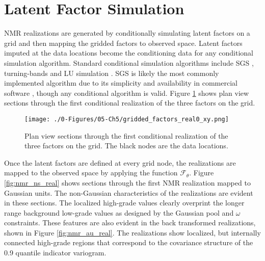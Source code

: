 \FloatBarrier
\section{Latent Factor Simulation}
\label{sec:latentsim}

\gls{NMR} realizations are generated by conditionally simulating latent factors on a grid and then mapping the gridded factors to observed space. Latent factors imputed at the data locations become the conditioning data for any conditional simulation algorithm. Standard conditional simulation algorithms include \gls{SGS} \citep{gomez-hernandez1993joint}, turning-bands \citep{journel1974geostatistics} and LU simulation \citep{davis1987production}. \gls{SGS} is likely the most commonly implemented algorithm due to its simplicity and availability in commercial software \citep{rossi2013mineral}, though any conditional algorithm is valid. Figure \ref{fig:gridded_factors_real0_xy} shows plan view sections through the first conditional realization of the three factors on the grid.

\begin{figure}[htb!]
    \centering
    \texttt{[image: ./0-Figures/05-Ch5/gridded\_factors\_real0\_xy.png]}
    \caption{Plan view sections through the first conditional realization of the three factors on the grid. The black nodes are the data locations.}
    \label{fig:gridded_factors_real0_xy}
\end{figure}

Once the latent factors are defined at every grid node, the realizations are mapped to the observed space by applying the function $\mathcal{F}_{\theta}$. Figure \ref{fig:nmr_ns_real} shows sections through the first \gls{NMR} realization mapped to Gaussian units. The non-Gaussian characteristics of the realizations are evident in these sections. The localized high-grade values clearly overprint the longer range background low-grade values as designed by the Gaussian pool and $\omega$ constraints. These features are also evident in the back transformed realizations, shown in Figure \ref{fig:nmr_au_real}. The realizations show localized, but internally connected high-grade regions that correspond to the covariance structure of the 0.9 quantile indicator variogram.

